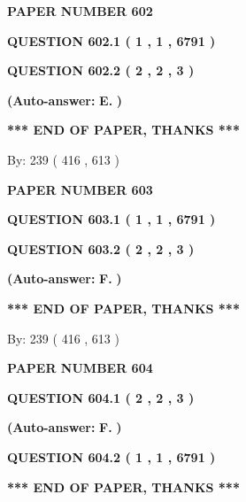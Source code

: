 \documentclass[12pt]{article}
\begin{document}
   
 {\textbf{ \Large{ PAPER NUMBER  602  }}}
   
   
   
   
  
  
{\textbf{\large{QUESTION
602.1 
 ( 1 , 1 , 6791 )
}}}
  
  
{\textbf{\large{QUESTION
602.2 
 ( 2 , 2 , 3 )
}}}
 
 
{\textbf{(Auto-answer:}}
{\textbf{\large{
E.}}}
{\textbf{)}}
 
 
   
   
   
   
\vspace{1.0in} 
{\textbf{\large{ *** END OF PAPER, THANKS *** }}} 
   
   
\hspace{1.0in} By: 
 239 ( 416 ,  613 )
   
   
   
   
\newpage 
\setcounter{page}{ 
   603001 } 
   
   
 {\textbf{ \Large{ PAPER NUMBER  603  }}}
   
   
   
   
  
  
{\textbf{\large{QUESTION
603.1 
 ( 1 , 1 , 6791 )
}}}
  
  
{\textbf{\large{QUESTION
603.2 
 ( 2 , 2 , 3 )
}}}
 
 
{\textbf{(Auto-answer:}}
{\textbf{\large{
F.}}}
{\textbf{)}}
 
 
   
   
   
   
\vspace{1.0in} 
{\textbf{\large{ *** END OF PAPER, THANKS *** }}} 
   
   
\hspace{1.0in} By: 
 239 ( 416 ,  613 )
   
   
   
   
\newpage 
\setcounter{page}{ 
   604001 } 
   
   
 {\textbf{ \Large{ PAPER NUMBER  604  }}}
   
   
   
   
  
  
{\textbf{\large{QUESTION
604.1 
 ( 2 , 2 , 3 )
}}}
 
 
{\textbf{(Auto-answer:}}
{\textbf{\large{
F.}}}
{\textbf{)}}
 
 
  
  
{\textbf{\large{QUESTION
604.2 
 ( 1 , 1 , 6791 )
}}}
   
   
   
   
\vspace{1.0in} 
{\textbf{\large{ *** END OF PAPER, THANKS *** }}} 
   
\end{document}
